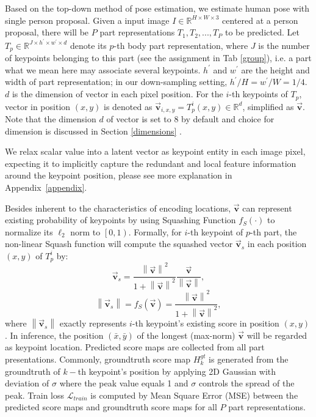 \documentclass[journal]{IEEEtran}
\begin{document}
Based on the top-down method of pose estimation, we estimate human pose with single person proposal. Given a input image $I\in \mathbb{R}^{H\times W\times 3}$ centered at a person proposal, there will be $P$ part representations $T_1,T_2,...,T_P$ to be predicted. Let $T_p \in \mathbb{R}^{ J \times h^{'}\times w^{'}\times d}$ denote its $p$-th body part representation, where $J$ is the number of keypoints belonging to this part (see the assignment in Tab \ref{group}), i.e. a part what we mean here may associate several keypoints.  $h^{'}$ and $w^{'}$ are the height and width of part representation; in our down-sampling setting, $h^{'}/H=w^{'}/W=1/4$.  $d$ is the dimension of vector in each pixel position. For the $i$-th keypoints of $T_p$, vector in position $\left(x,y\right)$ is denoted as $\vec{\mathbf{v}}_{i,x,y}=T_p^i\left(x,y\right) \in \mathbb{R}^d$, simplified as $\vec{\mathbf{v}}$. Note that the dimension  $d$ of vector is set to 8 by default and choice for dimension is discussed in Section \ref{dimensions} .

We relax scalar value into a latent vector as keypoint entity in each image pixel, expecting it to implicitly capture the redundant and local feature information around the keypoint position, please see more explanation in Appendix~\ref{appendix}. 

Besides inherent to the characteristics of encoding locations, $\vec{\mathbf{v}}$ can represent existing probability of keypoints by using Squashing Function $f_S(\cdot)$ \cite{sabour2017dynamic} to normalize its $\ell_{2}$ norm to $\left[ 0,1\right)$. Formally, for $i$-th keypoint of $p$-th part, the non-linear Squash function will compute the squashed vector $\vec{\mathbf{v}}_s$ in each position $(x,y)$ of $T_p^i$  by:
\begin{equation}
\vec{\mathbf{v}}_s=\frac{\left\|\vec{\mathbf{v}}\right\|^{2}}{1+\left\|\vec{\mathbf{\mathbf{v}}}\right\|^{2}} \frac{\vec{\mathbf{\mathbf{v}}}}{\left\|\vec{\mathbf{\mathbf{v}}}\right\|},
\end{equation}
\begin{equation}
\left\|\vec{\mathbf{v}}_s\right\|=f_{S}(\vec{\mathbf{v}})=\frac{\left\|\vec{\mathbf{v}}\right\|^{2}}{1+\left\|\vec{\mathbf{v}}\right\|^{2}},
\end{equation}
where $\left\|\vec{\mathbf{v}}_s\right\|$ exactly represents $i$-th keypoint's existing score in position $(x,y)$. In inference, the position $(\bar{x},\bar{y})$ of the longest (max-norm) $\vec{\mathbf{v}}$ will be regarded as keypoint location. Predicted score maps are collected from all part presentations. Commonly,  groundtruth score map $H_{k}^{gt}$ is generated from the groundtruth of $k-$th keypoint's position by applying 2D Gaussian with deviation of $\sigma$ where the peak value equals 1 and  $\sigma$ controls the spread of the peak. Train loss $\mathcal{L}_{train}$ is computed by Mean Square Error (MSE) between the predicted score maps and groundtruth score maps for all $P$ part representations. 
\end{document}
